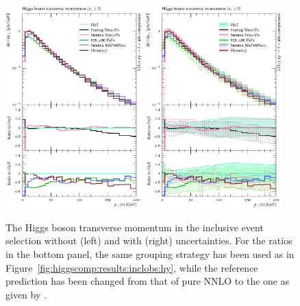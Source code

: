 \begin{figure}[t!]
  \centering
  \includegraphics[width=0.47\textwidth]{figures/hjetscomp_u_H_pT_incl.pdf}
  \hfill
  \includegraphics[width=0.47\textwidth]{figures/hjetscomp_H_pT_incl.pdf}
  \caption{\label{fig:higgscomp:results:inclobs:hpt}%
    The Higgs boson transverse momentum in the inclusive event
    selection without (left) and with (right) uncertainties. For the
    ratios in the bottom panel, the same grouping strategy has been
    used as in Figure~\ref{fig:higgscomp:results:inclobs:hy}, while
    the reference prediction has been changed from that of pure NNLO
    to the one as given by \HqT.}
\end{figure}

